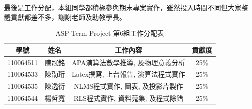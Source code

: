 \documentclass[conference]{IEEEtran}
\begin{document}
    最後是工作分配，本組同學都積極參與期末專案實作，雖然投入時間不同但大家整體貢獻都差不多，謝謝老師及助教學長。
    \begin{table}[!ht]
    \centering
        \begin{tabular}{|| c | c | c | c ||} 
            \hline\hline
            學號 & 姓名 & 工作內容 &  貢獻度 \\ [1ex]
            \hline\hline
            110064511 & 陳冠銘 & APA演算法數學推導, 及物理意義分析 & 25\% \\ [1ex]
            \hline
            110064533 & 陳劭珩 & Latex撰寫, 上台報告, 演算法程式實作  & 25\%  \\ [1ex]
            \hline
            110064535 & 陳逸衍 & NLMS程式實作, 圖表, 及投影片製作 & 25\%  \\ [1ex]
            \hline
            110064544 & 楊哲寬 & RLS程式實作, 資料蒐集, 及程式除錯 & 25\% \\ [1ex]
            \hline\hline
        \end{tabular}
        \label{table} \caption{ASP Term Project 第6組工作分配表}
    \end{table}
    
    
     
    
\end{document}
